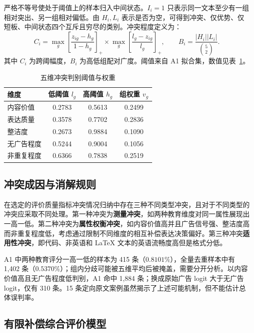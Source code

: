 严格不等号使处于阈值上的样本归入中间状态。$I_i=1$ 只表示同一文本至少有一组相对突出、另一组相对偏低。由 $H_i,L_i$ 表示是否为空，可得到冲突、仅优势、仅短板、中间状态四个互斥且穷尽的类别。冲突程度定义为：
  \begin{equation}
  C_i=\max_g\left[\frac{z_{ig}-h_g}{1-h_g}\right]_+
     \times\max_g\left[\frac{l_g-z_{ig}}{l_g}\right]_+,
  \qquad
  B_i=\frac{|H_i||L_i|}{\binom{5}{2}}.
\label{eq:q12-strength}
\end{equation}
其中 $C_i$ 为跨阈幅度，$B_i$ 为高低组配对广度。阈值来自 A1 拟合集，数值见表~\ref{tab:q12-thresholds}。

\begin{table}[htbp]
\centering
\caption{五维冲突判别阈值与权重}
\label{tab:q12-thresholds}
\begin{tabular}{lccc}
\toprule
维度 & 低阈值 $l_g$ & 高阈值 $h_g$ & 组权重 $v_g$ \\
\midrule
内容价值   & 0.2783 & 0.5613 & 0.2499 \\
表达质量   & 0.3578 & 0.7702 & 0.2836 \\
整洁度     & 0.2673 & 0.9884 & 0.1090 \\
无广告程度 & 0.5244 & 0.9004 & 0.1056 \\
非重复程度 & 0.6366 & 0.7838 & 0.2519 \\
\bottomrule
\end{tabular}
\end{table}

\subsection{冲突成因与消解规则}

在选定的评价质量指标冲突情况归纳中存在三种不同类型冲突，且对于不同类型的冲突应采取不同处理。第一种冲突为\textbf{测量冲突}，如两种教育维度对同一属性展现出一高一低。第二种冲突为\textbf{属性权衡冲突}，如内容价值高并且广告信号强、整洁度高而非重复程度低，考虑通过限制不同维度的相互补偿表达决策偏好。第三种冲突\textbf{适用性冲突}，即代码、非英语和 LaTeX 文本的英语流畅度高但是格式分低。

A1 中两种教育评分一高一低的样本为 415 条（$0.8101\%$），全量去重样本中有 1,402 条（$0.5370\%$）；组内分歧可能被五维平均后被掩盖，需要分开分析。以内容价值高且无广告程度低判别，A1 命中 1,884 条；换成原始广告 logit 大于无广告 logit，仅有 310 条。15 条定向原文案例虽然揭示了上述可能机制，但不能估计总体误判率。

\subsection{有限补偿综合评价模型}


